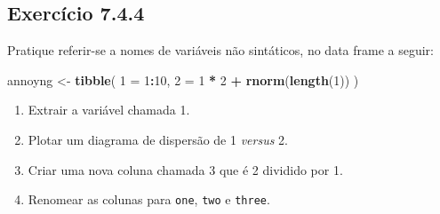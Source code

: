 \documentclass[
]{latex/krantz}
\newenvironment{Shaded}{\begin{snugshade}}{\end{snugshade}}
\newcommand{\AttributeTok}[1]{\textcolor[rgb]{0.13,0.29,0.53}{#1}}
\newcommand{\DecValTok}[1]{\textcolor[rgb]{0.00,0.00,0.81}{#1}}
\newcommand{\FunctionTok}[1]{\textcolor[rgb]{0.13,0.29,0.53}{\textbf{#1}}}
\newcommand{\NormalTok}[1]{#1}
\newcommand{\OtherTok}[1]{\textcolor[rgb]{0.56,0.35,0.01}{#1}}
\newcommand{\SpecialCharTok}[1]{\textcolor[rgb]{0.81,0.36,0.00}{\textbf{#1}}}
\newcommand{\StringTok}[1]{\textcolor[rgb]{0.31,0.60,0.02}{#1}}
\providecommand{\tightlist}{%
  \setlength{\itemsep}{0pt}\setlength{\parskip}{0pt}}
\theoremstyle{definition}
\theoremstyle{definition}
\theoremstyle{definition}
\theoremstyle{definition}
\theoremstyle{remark}
\begin{document}
\hypertarget{exr7-4-4}{%
\subsection*{Exercício 7.4.4}\label{exr7-4-4}}

Pratique referir-se a nomes de variáveis não sintáticos, no data frame a seguir:

\begin{Shaded}
\begin{Highlighting}[]
\NormalTok{annoyng }\OtherTok{\textless{}{-}} \FunctionTok{tibble}\NormalTok{(}
    \StringTok{\textasciigrave{}}\AttributeTok{1}\StringTok{\textasciigrave{}} \OtherTok{=} \DecValTok{1}\SpecialCharTok{:}\DecValTok{10}\NormalTok{,}
    \StringTok{\textasciigrave{}}\AttributeTok{2}\StringTok{\textasciigrave{}} \OtherTok{=} \StringTok{\textasciigrave{}}\AttributeTok{1}\StringTok{\textasciigrave{}} \SpecialCharTok{*} \DecValTok{2} \SpecialCharTok{+} \FunctionTok{rnorm}\NormalTok{(}\FunctionTok{length}\NormalTok{(}\StringTok{\textasciigrave{}}\AttributeTok{1}\StringTok{\textasciigrave{}}\NormalTok{))}
\NormalTok{)}
\end{Highlighting}
\end{Shaded}

\begin{enumerate}
\def\labelenumi{\alph{enumi}.}
\tightlist
\item
  Extrair a variável chamada 1.
\item
  Plotar um diagrama de dispersão de 1 \emph{versus} 2.
\item
  Criar uma nova coluna chamada 3 que é 2 dividido por 1.
\item
  Renomear as colunas para \texttt{one}, \texttt{two} e \texttt{three}.
\end{enumerate}
\end{document}
